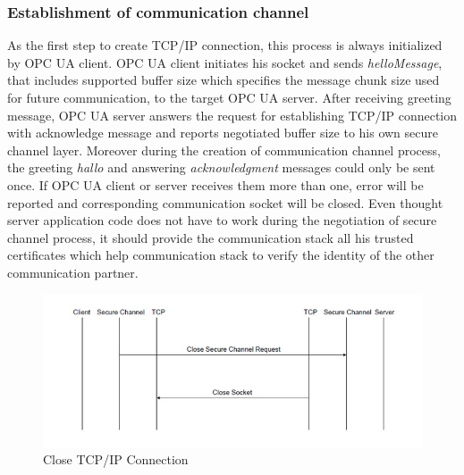 \documentclass[]{llncs}
\begin{document}
\subsubsection{Establishment of communication channel}
As the first step to create TCP/IP connection, this process is always initialized by OPC UA client. OPC UA client initiates his socket and sends \emph{helloMessage}, that includes supported buffer size which specifies the message chunk size used for future communication, to the target OPC UA server. After receiving greeting message, OPC UA server answers the request for establishing TCP/IP connection with acknowledge message and reports negotiated buffer size to his own secure channel layer. Moreover during the creation of communication channel process, the greeting \emph{hallo} and answering \emph{acknowledgment} messages could only be sent once. If OPC UA client or server receives them more than one, error will be reported and corresponding communication socket will be closed. Even thought server application code does not have to work during the negotiation of secure channel process, it should provide the communication stack all his trusted certificates which help communication stack to verify the identity of the other communication partner. 
\begin{figure}[ht]
	\centering
	\includegraphics[width=1\textwidth]{tcp_2.jpg}
		\caption[ ]{Close TCP/IP Connection\cite{O6}}
	\label{fig:tcp_2}
\end{figure}
\end{document}
